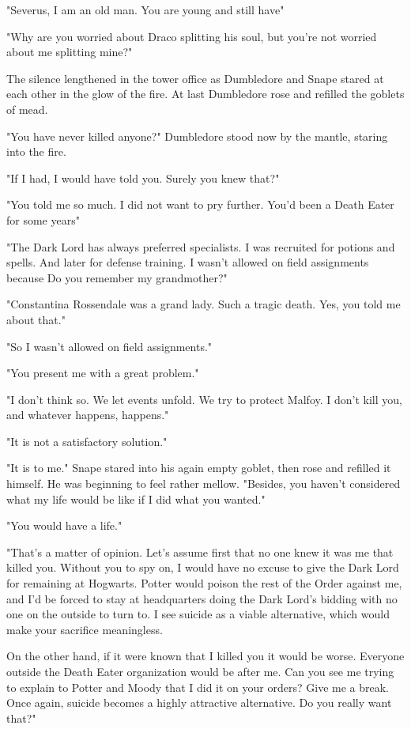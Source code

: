 "Severus, I am an old man. You are young and still have{\el}"

"Why are you worried about Draco splitting his soul, but you're not worried about me splitting mine?"

The silence lengthened in the tower office as Dumbledore and Snape stared at each other in the glow of the fire. At last Dumbledore rose and refilled the goblets of mead.

"You have never killed anyone?" Dumbledore stood now by the mantle, staring into the fire.

"If I had, I would have told you. Surely you knew that?"

"You told me so much. I did not want to pry further. You'd been a Death Eater for some years{\el}"

"The Dark Lord has always preferred specialists. I was recruited for potions and spells. And later for defense training. I wasn't allowed on field assignments because{\el} Do you remember my grandmother?"

"Constantina Rossendale was a grand lady. Such a tragic death. Yes, you told me about that."

"So{\el} I wasn't allowed on field assignments."

"You present me with a great problem."

"I don't think so. We let events unfold. We try to protect Malfoy. I don't kill you, and whatever happens, happens."

"It is not a satisfactory solution."

"It is to me." Snape stared into his again empty goblet, then rose and refilled it himself. He was beginning to feel rather mellow. "Besides, you haven't considered what my life would be like if I did what you wanted."

"You would have a life."

"That's a matter of opinion. Let's assume first that no one knew it was me that killed you. Without you to spy on, I would have no excuse to give the Dark Lord for remaining at Hogwarts. Potter would poison the rest of the Order against me, and I'd be forced to stay at headquarters doing the Dark Lord's bidding with no one on the outside to turn to. I see suicide as a viable alternative, which would make your sacrifice meaningless.

\textooquote On the other hand, if it were known that I killed you it would be worse. Everyone outside the Death Eater organization would be after me. Can you see me trying to explain to Potter and Moody that I did it on your orders? Give me a break. Once again, suicide becomes a highly attractive alternative. Do you really want that?"

